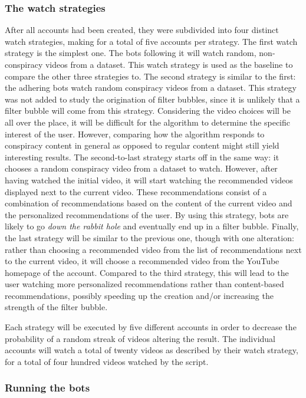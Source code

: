 \documentclass[../main.tex]{subfiles}
\begin{document}
\subsubsection{The watch strategies}
After all accounts had been created, they were subdivided into four distinct watch strategies, making for
a total of five accounts per strategy. The first watch strategy is the simplest one. The bots following 
it will watch random, non-conspiracy videos from a dataset. This watch strategy is used as the 
baseline to compare the other three strategies to. The second strategy is similar to the first: the 
adhering bots watch random conspiracy videos from a dataset. This strategy was not added to 
study the origination of filter bubbles, since it is unlikely that a filter bubble will come from this 
strategy. Considering the video choices will be all over the place, it will be difficult for the 
algorithm to determine the specific interest of the user. However, comparing how the algorithm 
responds to conspiracy content in general as opposed to regular content might still yield interesting 
results. The second-to-last strategy starts off in the same way: it chooses a random conspiracy video 
from a dataset to watch. However, after having watched the initial video, it will start watching the 
recommended videos displayed next to the current video. These recommendations consist of a combination of
recommendations based on the content of the current video and the personalized recommendations of the 
user. By using this strategy, bots are likely to go \textit{down the rabbit hole} and eventually end up 
in a filter bubble. Finally, the last strategy will be similar to the previous one, though with one 
alteration: rather than choosing a recommended video from the list of recommendations next to the current
video, it will choose a recommended video from the YouTube homepage of the account. Compared to the third
strategy, this will lead to the user watching more personalized recommendations rather than content-based
recommendations, possibly speeding up the creation and/or increasing the strength of the filter bubble. 

Each strategy will be executed by five different accounts in order to decrease the probability of a 
random streak of videos altering the result. The individual accounts will watch a total of twenty videos 
as described by their watch strategy, for a total of four hundred videos watched by the script. 

\subsubsection{Running the bots}
\end{document}
